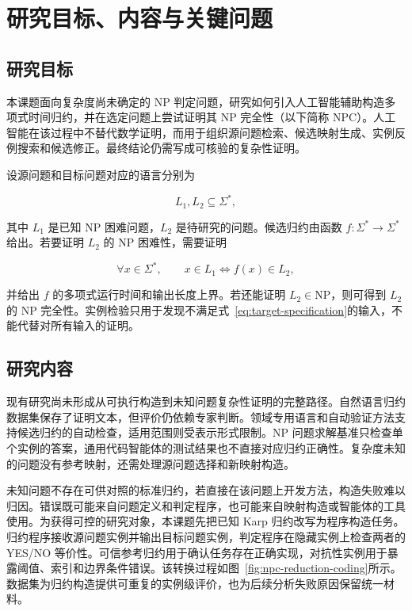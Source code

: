 \chapter{研究目标、内容与关键问题}\label{chap:content}

\section{研究目标}

本课题面向复杂度尚未确定的 NP 判定问题，研究如何引入人工智能辅助构造多项式时间归约，并在选定问题上尝试证明其 NP 完全性（以下简称 NPC）。人工智能在该过程中不替代数学证明，而用于组织源问题检索、候选映射生成、实例反例搜索和候选修正。最终结论仍需写成可核验的复杂性证明。

设源问题和目标问题对应的语言分别为

\begin{equation}
    L_1,L_2\subseteq\Sigma^*,
    \label{eq:source-target-languages}
\end{equation}

其中 \(L_1\) 是已知 NP 困难问题，\(L_2\) 是待研究的问题。候选归约由函数 \(f:\Sigma^*\rightarrow\Sigma^*\) 给出。若要证明 \(L_2\) 的 NP 困难性，需要证明

\begin{equation}
    \forall x\in\Sigma^*,\qquad
    x\in L_1 \Longleftrightarrow f(x)\in L_2,
    \label{eq:target-specification}
\end{equation}

并给出 \(f\) 的多项式运行时间和输出长度上界。若还能证明 \(L_2\in\mathrm{NP}\)，则可得到 \(L_2\) 的 NP 完全性。实例检验只用于发现不满足式~\eqref{eq:target-specification}的输入，不能代替对所有输入的证明。

\section{研究内容}

现有研究尚未形成从可执行构造到未知问题复杂性证明的完整路径。自然语言归约数据集保存了证明文本，但评价仍依赖专家判断。领域专用语言和自动验证方法支持候选归约的自动检查，适用范围则受表示形式限制。NP 问题求解基准只检查单个实例的答案，通用代码智能体的测试结果也不直接对应归约正确性。复杂度未知的问题没有参考映射，还需处理源问题选择和新映射构造。

未知问题不存在可供对照的标准归约，若直接在该问题上开发方法，构造失败难以归因。错误既可能来自问题定义和判定程序，也可能来自映射构造或智能体的工具使用。为获得可控的研究对象，本课题先把已知 Karp 归约改写为程序构造任务。归约程序接收源问题实例并输出目标问题实例，判定程序在隐藏实例上检查两者的 YES/NO 等价性。可信参考归约用于确认任务存在正确实现，对抗性实例用于暴露阈值、索引和边界条件错误。该转换过程如图~\ref{fig:npc-reduction-coding}所示。数据集为归约构造提供可重复的实例级评价，也为后续分析失败原因保留统一材料。

